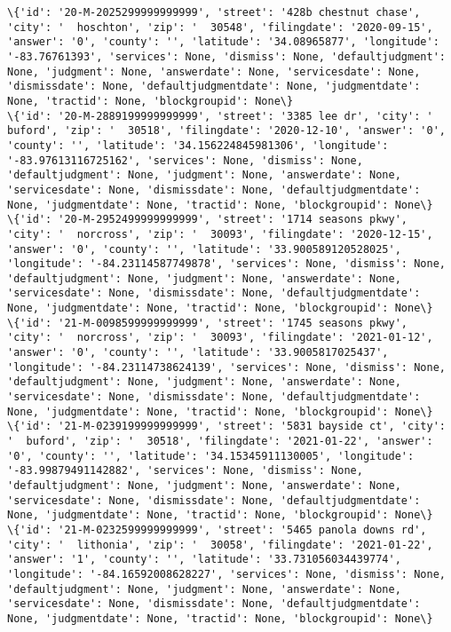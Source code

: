 \documentclass[11pt]{article}
\begin{document}
\begin{Verbatim}[commandchars=\\\{\}]
\{'id': '20-M-2025299999999999', 'street': '428b chestnut chase', 'city': '  hoschton', 'zip': '  30548', 'filingdate': '2020-09-15', 'answer': '0', 'county': '', 'latitude': '34.08965877', 'longitude': '-83.76761393', 'services': None, 'dismiss': None, 'defaultjudgment': None, 'judgment': None, 'answerdate': None, 'servicesdate': None, 'dismissdate': None, 'defaultjudgmentdate': None, 'judgmentdate': None, 'tractid': None, 'blockgroupid': None\}
\{'id': '20-M-2889199999999999', 'street': '3385 lee dr', 'city': '  buford', 'zip': '  30518', 'filingdate': '2020-12-10', 'answer': '0', 'county': '', 'latitude': '34.156224845981306', 'longitude': '-83.97613116725162', 'services': None, 'dismiss': None, 'defaultjudgment': None, 'judgment': None, 'answerdate': None, 'servicesdate': None, 'dismissdate': None, 'defaultjudgmentdate': None, 'judgmentdate': None, 'tractid': None, 'blockgroupid': None\}
\{'id': '20-M-2952499999999999', 'street': '1714 seasons pkwy', 'city': '  norcross', 'zip': '  30093', 'filingdate': '2020-12-15', 'answer': '0', 'county': '', 'latitude': '33.900589120528025', 'longitude': '-84.23114587749878', 'services': None, 'dismiss': None, 'defaultjudgment': None, 'judgment': None, 'answerdate': None, 'servicesdate': None, 'dismissdate': None, 'defaultjudgmentdate': None, 'judgmentdate': None, 'tractid': None, 'blockgroupid': None\}
\{'id': '21-M-0098599999999999', 'street': '1745 seasons pkwy', 'city': '  norcross', 'zip': '  30093', 'filingdate': '2021-01-12', 'answer': '0', 'county': '', 'latitude': '33.9005817025437', 'longitude': '-84.23114738624139', 'services': None, 'dismiss': None, 'defaultjudgment': None, 'judgment': None, 'answerdate': None, 'servicesdate': None, 'dismissdate': None, 'defaultjudgmentdate': None, 'judgmentdate': None, 'tractid': None, 'blockgroupid': None\}
\{'id': '21-M-0239199999999999', 'street': '5831 bayside ct', 'city': '  buford', 'zip': '  30518', 'filingdate': '2021-01-22', 'answer': '0', 'county': '', 'latitude': '34.15345911130005', 'longitude': '-83.99879491142882', 'services': None, 'dismiss': None, 'defaultjudgment': None, 'judgment': None, 'answerdate': None, 'servicesdate': None, 'dismissdate': None, 'defaultjudgmentdate': None, 'judgmentdate': None, 'tractid': None, 'blockgroupid': None\}
\{'id': '21-M-0232599999999999', 'street': '5465 panola downs rd', 'city': '  lithonia', 'zip': '  30058', 'filingdate': '2021-01-22', 'answer': '1', 'county': '', 'latitude': '33.731056034439774', 'longitude': '-84.16592008628227', 'services': None, 'dismiss': None, 'defaultjudgment': None, 'judgment': None, 'answerdate': None, 'servicesdate': None, 'dismissdate': None, 'defaultjudgmentdate': None, 'judgmentdate': None, 'tractid': None, 'blockgroupid': None\}

\end{Verbatim}
\end{document}
